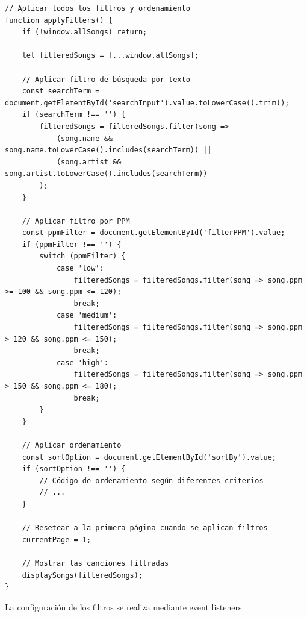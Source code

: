 \documentclass[a4paper,12pt]{article}
\begin{document}
\begin{verbatim}
// Aplicar todos los filtros y ordenamiento
function applyFilters() {
    if (!window.allSongs) return;
    
    let filteredSongs = [...window.allSongs];
    
    // Aplicar filtro de búsqueda por texto
    const searchTerm = document.getElementById('searchInput').value.toLowerCase().trim();
    if (searchTerm !== '') {
        filteredSongs = filteredSongs.filter(song => 
            (song.name && song.name.toLowerCase().includes(searchTerm)) || 
            (song.artist && song.artist.toLowerCase().includes(searchTerm))
        );
    }
    
    // Aplicar filtro por PPM
    const ppmFilter = document.getElementById('filterPPM').value;
    if (ppmFilter !== '') {
        switch (ppmFilter) {
            case 'low':
                filteredSongs = filteredSongs.filter(song => song.ppm >= 100 && song.ppm <= 120);
                break;
            case 'medium':
                filteredSongs = filteredSongs.filter(song => song.ppm > 120 && song.ppm <= 150);
                break;
            case 'high':
                filteredSongs = filteredSongs.filter(song => song.ppm > 150 && song.ppm <= 180);
                break;
        }
    }
    
    // Aplicar ordenamiento
    const sortOption = document.getElementById('sortBy').value;
    if (sortOption !== '') {
        // Código de ordenamiento según diferentes criterios
        // ...
    }
    
    // Resetear a la primera página cuando se aplican filtros
    currentPage = 1;
    
    // Mostrar las canciones filtradas
    displaySongs(filteredSongs);
}
\end{verbatim}

La configuración de los filtros se realiza mediante event listeners:
\end{document}
